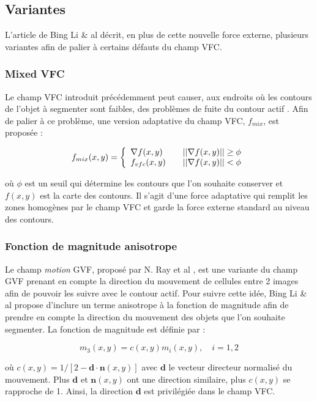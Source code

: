 \subsection{Variantes}
L'article de Bing Li \& al décrit, en plus de cette nouvelle force externe, plusieurs variantes afin de palier à certains défauts du champ VFC.

\subsubsection*{Mixed VFC}

Le champ VFC introduit précédemment peut causer, aux endroits où les contours de l'objet à segmenter sont faibles, des problèmes de fuite du contour actif \cite{vfc}. Afin de palier à ce problème, une version adaptative du champ VFC, $f_{mix}$, est proposée :

\begin{equation}
 f_{mix}(x,y) = \left\{ 
  \begin{array}{l l}
    \nabla f(x,y) & \quad ||\nabla f(x,y)|| \geq \phi \\
     f_{vfc}(x,y) & \quad ||\nabla f(x,y)||   <  \phi
  \end{array} \right.
\end{equation}

où $\phi$ est un seuil qui détermine les contours que l'on souhaite conserver et $f(x,y)$ est la carte des contours. Il s'agit d'une force adaptative qui remplit les zones homogènes par le champ VFC et garde la force externe standard au niveau des contours.

\subsubsection*{Fonction de magnitude anisotrope}

Le champ \textit{motion} GVF, proposé par N. Ray et al \cite{mgvf}, est une variante du champ GVF prenant en compte la direction du mouvement de cellules entre 2 images afin de pouvoir les suivre avec le contour actif. Pour suivre cette idée, Bing Li \& al propose d'inclure un terme anisotrope à la fonction de magnitude afin de prendre en compte la direction du mouvement des objets que l'on souhaite segmenter. La fonction de magnitude est définie par :

\begin{equation}
	m_3(x,y) = c(x,y)m_i(x,y), \quad i=1,2
\end{equation}

où $c(x,y)=1/[2-\mathbf{d} \cdot \mathbf{n}(x,y)]$ avec $\mathbf{d}$ le vecteur directeur normalisé du mouvement. Plus $\mathbf{d}$ et $\mathbf{n}(x,y)$ ont une direction similaire, plus $c(x,y)$ se rapproche de 1. Ainsi, la direction $\mathbf{d}$ est privilégiée dans le champ VFC. 
